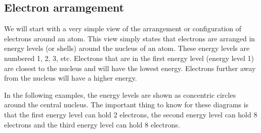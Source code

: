            \subsection*{Electron arramgement}
            \nopagebreak
            \label{m38741*id9722401}We will start with a very simple view of the arrangement or configuration of electrons around an atom. This view simply states that electrons are arranged in energy levels (or shells) around the nucleus of an atom. These energy levels are numbered 1, 2, 3, etc. Electrons that are in the first energy level (energy level 1) are closest to the nucleus and will have the lowest energy. Electrons further away from the nucleus will have a higher energy. \par 
\label{m38741*id259357}In the following examples, the energy levels are shown as concentric circles around the central nucleus. The important thing to know for these diagrams is that the first energy level can hold 2 electrons, the second energy level can hold 8 electrons and the third energy level can hold 8 electrons.\par 
